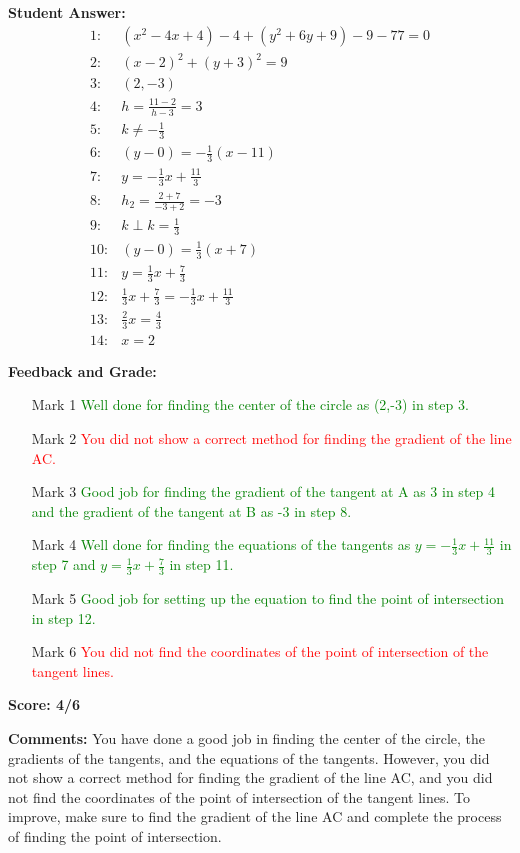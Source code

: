 \documentclass{article}
\begin{document}
\textbf{Student Answer:}
\begin{align*}
1: & (x^{2}-4x+4)-4+(y^{2}+6y+9)-9-77=0 \\
2: & (x-2)^{2}+(y+3)^{2}=9 \\
3: & (2,-3) \\
4: & h=\frac{11-2}{h-3}=3 \\
5: & k\neq-\frac{1}{3} \\
6: & (y-0)=-\frac{1}{3}(x-11) \\
7: & y=-\frac{1}{3}x+\frac{11}{3} \\
8: & h_2=\frac{2+7}{-3+2}=-3 \\
9: & k\perp k=\frac{1}{3} \\
10: & (y-0)=\frac{1}{3}(x+7) \\
11: & y=\frac{1}{3}x+\frac{7}{3} \\
12: & \frac{1}{3}x+\frac{7}{3}=-\frac{1}{3}x+\frac{11}{3} \\
13: & \frac{2}{3}x=\frac{4}{3} \\
14: & x=2
\end{align*}

\textbf{Feedback and Grade:}
\begin{itemize}
\item[Mark 1] \textcolor{green}{Well done for finding the center of the circle as (2,-3) in step 3.}
\item[Mark 2] \textcolor{red}{You did not show a correct method for finding the gradient of the line AC.}
\item[Mark 3] \textcolor{green}{Good job for finding the gradient of the tangent at A as 3 in step 4 and the gradient of the tangent at B as -3 in step 8.}
\item[Mark 4] \textcolor{green}{Well done for finding the equations of the tangents as $y=-\frac{1}{3}x+\frac{11}{3}$ in step 7 and $y=\frac{1}{3}x+\frac{7}{3}$ in step 11.}
\item[Mark 5] \textcolor{green}{Good job for setting up the equation to find the point of intersection in step 12.}
\item[Mark 6] \textcolor{red}{You did not find the coordinates of the point of intersection of the tangent lines.}
\end{itemize}

\textbf{Score: 4/6}

\textbf{Comments:} You have done a good job in finding the center of the circle, the gradients of the tangents, and the equations of the tangents. However, you did not show a correct method for finding the gradient of the line AC, and you did not find the coordinates of the point of intersection of the tangent lines. To improve, make sure to find the gradient of the line AC and complete the process of finding the point of intersection.
\end{document}
